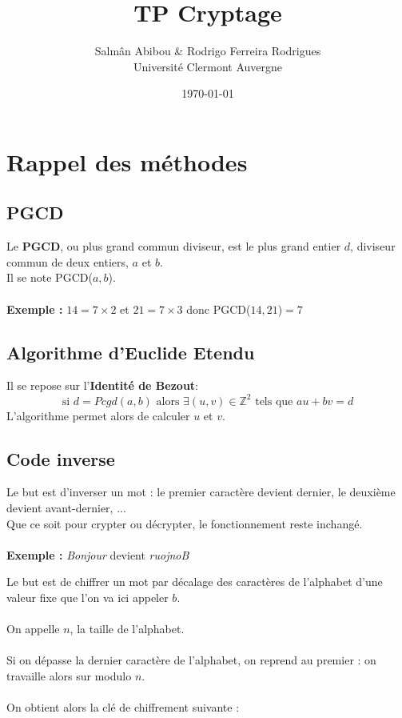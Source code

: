\documentclass[12pt,french,titlepage]{article}
\title{TP Cryptage}
\author{Salmân Abibou \& Rodrigo Ferreira Rodrigues \\
Université Clermont Auvergne\\}
\date{\today}
\begin{document}
	\maketitle


	\tableofcontents
	\newpage
	
	\section{Rappel des méthodes}
	
	\subsection{PGCD}
	
	Le \textbf{PGCD}, ou  plus grand commun diviseur, est le plus grand entier $d$, diviseur commun de deux entiers, $a$ et $b$.\\
	Il se note PGCD($a,b$).\\
	\\
	\textbf{Exemple : }$14 = 7\times2$ et $21 = 7\times3$ donc PGCD($14,21$)$ = 7$
	
	\subsection{Algorithme d'Euclide Etendu}
	
	Il se repose sur l'\textbf{Identité de Bezout}:\\
	\begin{equation}
	\text{si } d=Pcgd(a,b) \text{ alors } \exists (u,v)\in \mathbb{Z}^2 \text{ tels que }au+bv=d
	\end{equation}
	L'algorithme permet alors de calculer $u$ et $v$.
	\subsection{Code inverse}
	
	Le but est d'inverser un mot : le premier caractère devient dernier, le deuxième devient avant-dernier, ...\\
	Que ce soit pour crypter ou décrypter, le fonctionnement reste inchangé.\\
	\\
	\textbf{Exemple : }\textit{Bonjour} devient \textit{ruojnoB}
	
		Le but est de chiffrer un mot par décalage des caractères de l'alphabet d'une valeur fixe que l'on va ici appeler $b$.\\
	\\
	On appelle $n$, la taille de l'alphabet.\\
	\\
	Si on dépasse la dernier caractère de l'alphabet, on reprend au premier : on travaille alors sur modulo $n$.\\
	\\
	On obtient alors la clé de chiffrement suivante :\\
	
\end{document}
